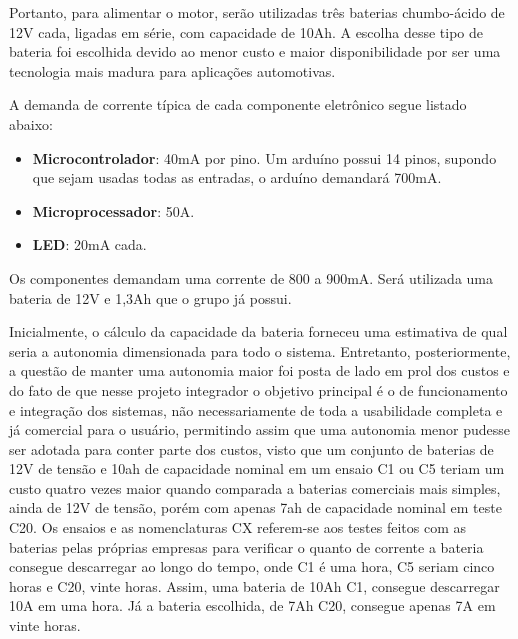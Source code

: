 	
	Portanto, para alimentar o motor, serão utilizadas três baterias chumbo-ácido de 12V cada, ligadas em série, com capacidade de 10Ah. A escolha desse tipo de bateria foi escolhida devido ao menor custo e maior disponibilidade por ser uma tecnologia mais madura para aplicações automotivas.

	A demanda de corrente típica de cada componente eletrônico segue listado abaixo:
	
	\begin{itemize}
		\item \textbf{Microcontrolador}: 40mA por pino. Um arduíno possui 14 pinos, supondo que sejam usadas todas as entradas, o arduíno demandará 700mA.
		\item \textbf{Microprocessador}: 50A.
		\item \textbf{LED}: 20mA cada.

	\end{itemize}

Os componentes demandam uma corrente de 800 a 900mA. Será utilizada uma bateria de 12V e 1,3Ah que o grupo já possui.

Inicialmente, o cálculo da capacidade da bateria forneceu uma estimativa de qual seria a autonomia dimensionada para todo o sistema. Entretanto, posteriormente, a questão de manter uma autonomia maior foi posta de lado em prol dos custos e do fato de que nesse projeto integrador o objetivo principal é o de funcionamento e integração dos sistemas, não necessariamente de toda a usabilidade completa e já comercial para o usuário, permitindo assim que uma autonomia menor pudesse ser adotada para conter parte dos custos, visto que um conjunto de baterias de 12V de tensão e 10ah de capacidade nominal em um ensaio C1 ou C5 teriam um custo quatro vezes maior quando comparada a baterias comerciais mais simples, ainda de 12V de tensão, porém com apenas 7ah de capacidade nominal em teste C20. Os ensaios e as nomenclaturas CX referem-se aos testes feitos com as baterias pelas próprias empresas para verificar o quanto de corrente a bateria consegue descarregar ao longo do tempo, onde C1 é uma hora, C5 seriam cinco horas e C20, vinte horas. Assim, uma bateria de 10Ah C1, consegue descarregar 10A em uma hora. Já a bateria escolhida, de 7Ah C20, consegue apenas 7A em vinte horas.

